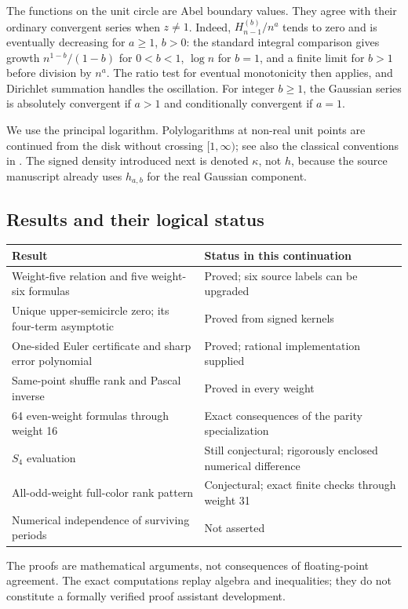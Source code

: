 \documentclass[11pt,a4paper]{article}
\numberwithin{equation}{section}
\theoremstyle{definition}
\theoremstyle{remark}
\begin{document}
The functions on the unit circle are Abel boundary values. They agree with their ordinary convergent series when $z\ne1$. Indeed, $H_{n-1}^{(b)}/n^a$ tends to zero and is eventually decreasing for $a\ge1$, $b>0$: the standard integral comparison gives growth $n^{1-b}/(1-b)$ for $0<b<1$, $\log n$ for $b=1$, and a finite limit for $b>1$ before division by $n^a$. The ratio test for eventual monotonicity then applies, and Dirichlet summation handles the oscillation. For integer $b\ge1$, the Gaussian series is absolutely convergent if $a>1$ and conditionally convergent if $a=1$.

We use the principal logarithm. Polylogarithms at non-real unit points are continued from the disk without crossing $[1,\infty)$; see also the classical conventions in \cite{DLMF2512}. The signed density introduced next is denoted $\kappa$, not $h$, because the source manuscript already uses $h_{a,b}$ for the real Gaussian component.

\subsection{Results and their logical status}
\begin{center}
\small
\begin{tabular}{@{}p{.52\linewidth}p{.39\linewidth}@{}}
\toprule
Result & Status in this continuation\\
\midrule
Weight-five relation and five weight-six formulas & Proved; six source labels can be upgraded\\
Unique upper-semicircle zero; its four-term asymptotic & Proved from signed kernels\\
One-sided Euler certificate and sharp error polynomial & Proved; rational implementation supplied\\
Same-point shuffle rank and Pascal inverse & Proved in every weight\\
64 even-weight formulas through weight 16 & Exact consequences of the parity specialization\\
$S_4$ evaluation & Still conjectural; rigorously enclosed numerical difference\\
All-odd-weight full-color rank pattern & Conjectural; exact finite checks through weight 31\\
Numerical independence of surviving periods & Not asserted\\
\bottomrule
\end{tabular}
\end{center}
The proofs are mathematical arguments, not consequences of floating-point agreement. The exact computations replay algebra and inequalities; they do not constitute a formally verified proof assistant development.
\end{document}
